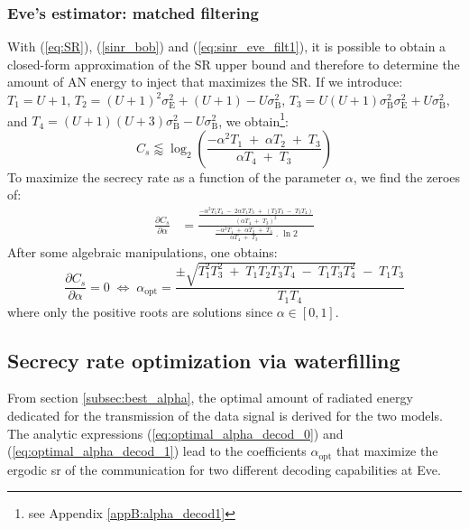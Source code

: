 \subsubsection{Eve's estimator: matched filtering}
With (\ref{eq:SR}), (\ref{sinr_bob}) and (\ref{eq:sinr_eve_filt1}), it is possible to obtain a closed-form approximation of the SR upper bound and therefore to determine the amount of AN energy to inject that maximizes the SR.
If we introduce: $T_1 = U+1$, $T_2 = (U+1)^2\sigma_{\text{E}}^2 + (U+1) - U\sigma_{\text{B}}^2$, $T_3 = U(U+1)\sigma_{\text{B}}^2\sigma_{\text{E}}^2 + U \sigma_{\text{B}}^2$, and $T_4=(U+1)(U+3)\sigma_{\text{B}}^2-U\sigma_{\text{B}}^2$, we obtain\footnote{see Appendix \ref{appB:alpha_decod1}}:
\begin{equation}
C_s \lessapprox \log_2 \left( \frac{-\alpha^2 T_1 \; + \; \alpha T_2 \; + \; T_3}{\alpha T_4 \; + \; T_3} \right)
\label{eq:SR_anal2_decod1}
\end{equation}
To  maximize the secrecy rate as a function of the parameter $\alpha$, we find the zeroes of:
\begin{equation}
\begin{split}
\frac{\partial C_s}{\partial \alpha} &= \frac{ \frac{-\alpha^2 T_1 T_4 \; - \; 2 \alpha T_1 T_3 \; + \; \left( T_2 T_3 \; - \; T_3 T_4 \right) }{\left( \alpha T_4 \; + \; T_3\right)^2} }{ \frac{-\alpha^2 T_1 \; + \; \alpha T_2 \; + \; T_3}{\alpha T_4 \; + \; T_3} \; . \; \ln{2}} 
\label{eq:SR_derivative}
\end{split}
\end{equation}
After some algebraic manipulations, one obtains: 
\begin{equation}
\frac{\partial C_s}{\partial \alpha} = 0
\; \Leftrightarrow \; \alpha_{\text{opt}} = \frac{\pm\sqrt{T_1^2 T_3^2 \; + \; T_1 T_2 T_3 T_4 \; - \; T_1 T_3 T_4^2} \; - \; T_1 T_3}{T_1 T_4}
\label{eq:optimal_alpha_decod_1}
\end{equation}
where only the positive roots are solutions since $\alpha \in [0,1]$.





\subsection{Secrecy rate optimization via waterfilling}
\label{subsec:perf_waterf}
From section \ref{subsec:best_alpha}, the optimal amount of radiated energy dedicated for the transmission of the data signal is derived for the two models. The analytic expressions (\ref{eq:optimal_alpha_decod_0}) and (\ref{eq:optimal_alpha_decod_1}) lead to the coefficients $\alpha_{\text{opt}}$ that maximize the ergodic \gls{sr} of the communication for two different decoding capabilities at Eve.\\

